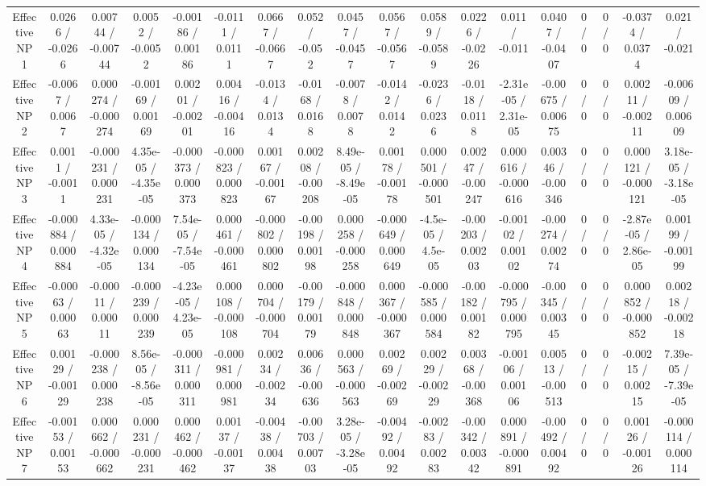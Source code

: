 \documentclass[10pt]{article}
\begin{document}
\begin{table}[htbp]
\begin{center}
\begin{tabular}{|c|c|c|c|c|c|c|c|c|c|c|c|c|c|c|c|c|c|}
  Effective NP 1 & 0.0266 / -0.0266 & 0.00744 / -0.00744 & 0.0052 / -0.0052 & -0.00186 / 0.00186 & -0.0111 / 0.0111 & 0.0667 / -0.0667 & 0.052 / -0.052 & 0.0457 / -0.0457 & 0.0567 / -0.0567 & 0.0589 / -0.0589 & 0.0226 / -0.0226 & 0.011 / -0.011 & 0.0407 / -0.0407 & 0 / 0 & 0 / 0 & -0.0374 / 0.0374 & 0.021 / -0.021 \\ 
  Effective NP 2 & -0.0067 / 0.0067 & 0.000274 / -0.000274 & -0.00169 / 0.00169 & 0.00201 / -0.00201 & 0.00416 / -0.00416 & -0.0134 / 0.0134 & -0.0168 / 0.0168 & -0.0078 / 0.0078 & -0.0142 / 0.0142 & -0.0236 / 0.0236 & -0.0118 / 0.0118 & -2.31e-05 / 2.31e-05 & -0.00675 / 0.00675 & 0 / 0 & 0 / 0 & 0.00211 / -0.00211 & -0.00609 / 0.00609 \\ 
  Effective NP 3 & 0.0011 / -0.0011 & -0.000231 / 0.000231 & 4.35e-05 / -4.35e-05 & -0.000373 / 0.000373 & -0.000823 / 0.000823 & 0.00167 / -0.00167 & 0.00208 / -0.00208 & 8.49e-05 / -8.49e-05 & 0.00178 / -0.00178 & 0.000501 / -0.000501 & 0.00247 / -0.00247 & 0.000616 / -0.000616 & 0.00346 / -0.00346 & 0 / 0 & 0 / 0 & 0.000121 / -0.000121 & 3.18e-05 / -3.18e-05 \\ 
  Effective NP 4 & -0.000884 / 0.000884 & 4.33e-05 / -4.32e-05 & -0.000134 / 0.000134 & 7.54e-05 / -7.54e-05 & 0.000461 / -0.000461 & -0.000802 / 0.000802 & -0.00198 / 0.00198 & 0.000258 / -0.000258 & -0.000649 / 0.000649 & -4.5e-05 / 4.5e-05 & -0.00203 / 0.00203 & -0.00102 / 0.00102 & -0.00274 / 0.00274 & 0 / 0 & 0 / 0 & -2.87e-05 / 2.86e-05 & 0.00199 / -0.00199 \\ 
  Effective NP 5 & -0.00063 / 0.00063 & -0.00011 / 0.00011 & -0.000239 / 0.000239 & -4.23e-05 / 4.23e-05 & 0.000108 / -0.000108 & 0.000704 / -0.000704 & -0.00179 / 0.00179 & -0.000848 / 0.000848 & 0.000367 / -0.000367 & -0.000585 / 0.000584 & -0.00182 / 0.00182 & -0.000795 / 0.000795 & -0.00345 / 0.00345 & 0 / 0 & 0 / 0 & 0.000852 / -0.000852 & 0.00218 / -0.00218 \\ 
  Effective NP 6 & 0.00129 / -0.00129 & -0.000238 / 0.000238 & 8.56e-05 / -8.56e-05 & -0.000311 / 0.000311 & -0.000981 / 0.000981 & 0.00234 / -0.00234 & 0.00636 / -0.00636 & 0.000563 / -0.000563 & 0.00269 / -0.00269 & 0.00229 / -0.00229 & 0.00368 / -0.00368 & -0.00106 / 0.00106 & 0.00513 / -0.00513 & 0 / 0 & 0 / 0 & -0.00215 / 0.00215 & 7.39e-05 / -7.39e-05 \\ 
  Effective NP 7 & -0.00153 / 0.00153 & 0.000662 / -0.000662 & 0.000231 / -0.000231 & 0.000462 / -0.000462 & 0.00137 / -0.00137 & -0.00438 / 0.00438 & -0.00703 / 0.00703 & 3.28e-05 / -3.28e-05 & -0.00492 / 0.00492 & -0.00283 / 0.00283 & -0.00342 / 0.00342 & 0.000891 / -0.000891 & -0.00492 / 0.00492 & 0 / 0 & 0 / 0 & 0.00126 / -0.00126 & -0.000114 / 0.000114 \\ 

\end{tabular}
\end{center}
\end{table}
\end{document}

